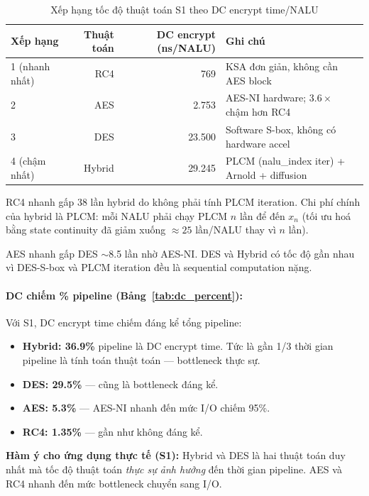 \begin{table}[ht]
\centering
\caption{Xếp hạng tốc độ thuật toán S1 theo DC encrypt time/NALU}
\label{tab:speed_rank_s1}
\begin{tabular}{lrrl}
\toprule
Xếp hạng & Thuật toán & DC encrypt (ns/NALU) & Ghi chú \\
\midrule
1 (nhanh nhất) & RC4    & 769    & KSA đơn giản, không cần AES block \\
2              & AES    & 2.753  & AES-NI hardware; $3.6\times$ chậm hơn RC4 \\
3              & DES    & 23.500 & Software S-box, không có hardware accel \\
4 (chậm nhất) & Hybrid & 29.245 & PLCM (nalu\_index iter) + Arnold + diffusion \\
\bottomrule
\end{tabular}
\end{table}

RC4 nhanh gấp 38 lần hybrid do không phải tính PLCM iteration. Chi phí chính
của hybrid là PLCM: mỗi NALU phải chạy PLCM $n$ lần để đến $x_n$ (tối ưu hoá
bằng state continuity đã giảm xuống $\approx 25$ lần/NALU thay vì $n$ lần).

AES nhanh gấp DES $\sim$8.5 lần nhờ AES-NI. DES và Hybrid có tốc độ gần nhau
vì DES-S-box và PLCM iteration đều là sequential computation nặng.

\paragraph{DC chiếm \% pipeline (Bảng~\ref{tab:dc_percent}):}

Với S1, DC encrypt time chiếm đáng kể tổng pipeline:
\begin{itemize}
  \item \textbf{Hybrid: 36.9\%} pipeline là DC encrypt time. Tức là gần 1/3
        thời gian pipeline là tính toán thuật toán --- bottleneck thực sự.
  \item \textbf{DES: 29.5\%} --- cũng là bottleneck đáng kể.
  \item \textbf{AES: 5.3\%} --- AES-NI nhanh đến mức I/O chiếm 95\%.
  \item \textbf{RC4: 1.35\%} --- gần như không đáng kể.
\end{itemize}

\textbf{Hàm ý cho ứng dụng thực tế (S1):}
Hybrid và DES là hai thuật toán duy nhất mà tốc độ thuật toán \emph{thực sự ảnh hưởng}
đến thời gian pipeline. AES và RC4 nhanh đến mức bottleneck chuyển sang I/O.


